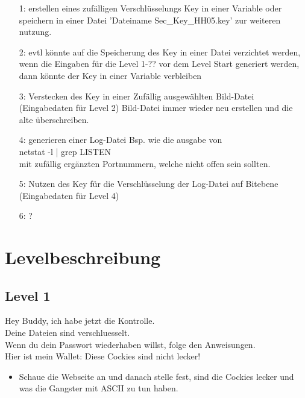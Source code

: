 \documentclass[a4paper 11pt]{article}
\begin{document}
\begin{enumerate}
\addtolength{\itemindent}{0.80cm}
\itemsep0em

\item[1:] erstellen eines zufälligen Verschlüsselungs Key in einer Variable oder speichern in einer Datei 'Dateiname\: Sec\_Key\_HH05.key' zur weiteren nutzung.
\item[2:] evtl könnte auf die Speicherung des Key in einer Datei verzichtet werden, wenn die Eingaben für die Level 1-?? vor dem Level Start generiert werden, dann könnte der Key in einer Variable verbleiben
\item[3:] Verstecken des Key in einer Zufällig ausgewählten Bild-Datei (Eingabedaten für Level 2) Bild-Datei immer wieder neu erstellen und die alte überschreiben.
\item[4:] generieren einer Log-Datei Bsp. wie die ausgabe von \\
netstat -l | grep LISTEN \\
mit zufällig ergänzten Portnummern, welche nicht offen sein sollten.
\item[5:] Nutzen des Key für die Verschlüsselung der Log-Datei auf Bitebene (Eingabedaten für Level 4)
\item[6:] ?

\end{enumerate}

\newpage
\normalsize
\section{Levelbeschreibung}
\subsection{Level 1}

Hey Buddy, ich habe jetzt die Kontrolle.\\
Deine Dateien sind verschluesselt.\\
Wenn du dein Passwort wiederhaben willst, folge den Anweisungen.\\
Hier ist mein Wallet: Diese Cockies sind nicht lecker!\\

\begin{itemize}
\addtolength{\itemindent}{0.80cm}
\itemsep0em
\item Schaue die Webseite an und danach stelle fest, sind die Cockies lecker und was die Gangster mit ASCII zu tun haben.
\end{itemize}
\end{document}
